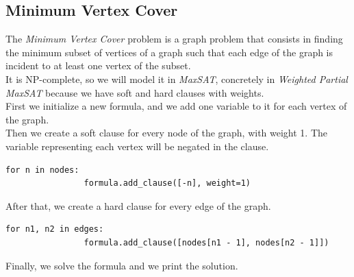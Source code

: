 \documentclass[11pt]{article}
\begin{document}
    \subsection{Minimum Vertex Cover}
    \label{subsec:minvc}
        The \textit{Minimum Vertex Cover} problem is a graph problem that consists in finding the minimum subset of vertices of a graph such that each edge of the graph is incident to at least one vertex of the subset.\\
        It is NP-complete, so we will model it in \textit{MaxSAT}, concretely in \textit{Weighted Partial MaxSAT} because we have soft and hard clauses with weights.\\
        First we initialize a new formula, and we add one variable to it for each vertex of the graph.\\
        Then we create a soft clause for every node of the graph, with weight 1.
        The variable representing each vertex will be negated in the clause.
        \begin{lstlisting}[label={lst:lstlisting}]
            for n in nodes:
                formula.add_clause([-n], weight=1)
        \end{lstlisting}
        After that, we create a hard clause for every edge of the graph.
        \begin{lstlisting}[label={lst:lstlisting2}]
            for n1, n2 in edges:
                formula.add_clause([nodes[n1 - 1], nodes[n2 - 1]])
        \end{lstlisting}
        Finally, we solve the formula and we print the solution.\\
\end{document}
